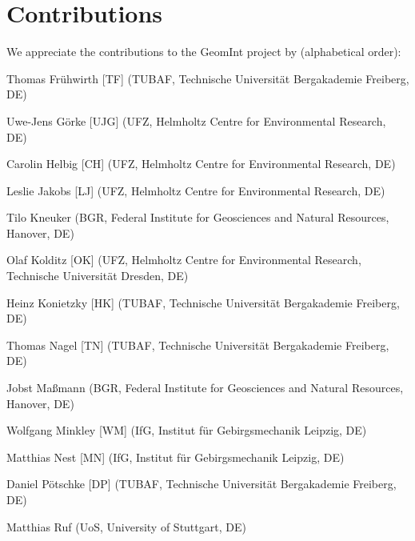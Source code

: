 \chapter*{Contributions}

We appreciate the contributions to the GeomInt project by  (alphabetical order):

\begin{list}{-}{\leftmargin=1em \itemindent=0em \itemsep=0.1em}

\item Thomas Fr\"uhwirth [TF] (TUBAF, Technische Universität Bergakademie Freiberg, DE)	

\item Uwe-Jens G\"orke [UJG] (UFZ, Helmholtz Centre for Environmental Research, DE)	

\item Carolin Helbig [CH] (UFZ, Helmholtz Centre for Environmental Research, DE)	

\item Leslie Jakobs [LJ] (UFZ, Helmholtz Centre for Environmental Research, DE)

\item Tilo Kneuker (BGR, Federal Institute for Geosciences and Natural Resources, Hanover, DE)

\item Olaf Kolditz [OK] (UFZ, Helmholtz Centre for Environmental Research, Technische Universität Dresden, DE) 

\item Heinz Konietzky [HK] (TUBAF, Technische Universität Bergakademie Freiberg, DE)	

\item Thomas Nagel [TN] (TUBAF, Technische Universität Bergakademie Freiberg, DE) 

\item Jobst Ma{\ss}mann (BGR, Federal Institute for Geosciences and Natural Resources, Hanover, DE)

\item Wolfgang Minkley [WM] (IfG, Institut für Gebirgsmechanik Leipzig, DE)	

\item Matthias Nest [MN] (IfG, Institut für Gebirgsmechanik Leipzig, DE)	
\item Daniel P\"otschke [DP] (TUBAF, Technische Universität Bergakademie Freiberg, DE)

\item Matthias Ruf (UoS, University of Stuttgart, DE)


\end{list}
